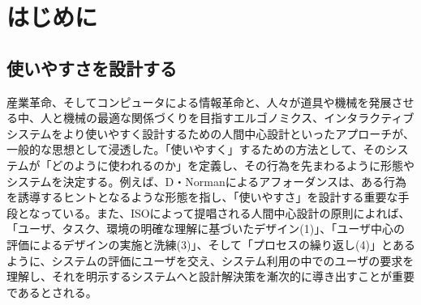 \chapter{はじめに}
\label{introduction}

\section*{使いやすさを設計する}
産業革命、そしてコンピュータによる情報革命と、人々が道具や機械を発展させる中、人と機械の最適な関係づくりを目指すエルゴノミクス、インタラクティブシステムをより使いやすく設計するための人間中心設計といったアプローチが、一般的な思想として浸透した。「使いやすく」するための方法として、そのシステムが「どのように使われるのか」を定義し、その行為を先まわるように形態やシステムを決定する。例えば、D・Normanによるアフォーダンスは、ある行為を誘導するヒントとなるような形態を指し、「使いやすさ」を設計する重要な手段となっている。また、ISOによって提唱される人間中心設計の原則\cite{hcd}によれば、「ユーザ、タスク、環境の明確な理解に基づいたデザイン(1)」、「ユーザ中心の評価によるデザインの実施と洗練(3)」、そして「プロセスの繰り返し(4)」とあるように、システムの評価にユーザを交え、システム利用の中でのユーザの要求を理解し、それを明示するシステムへと設計解決策を漸次的に導き出すことが重要であるとされる。


